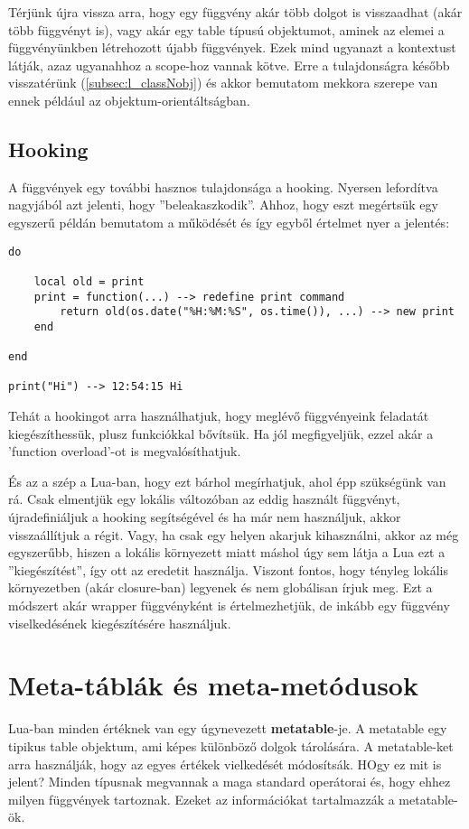\label{l_ref_proto}
Térjünk újra vissza arra, hogy egy függvény akár több dolgot is visszaadhat (akár több függvényt is), vagy akár egy table típusú objektumot, aminek az elemei a függvényünkben létrehozott újabb függvények. Ezek mind ugyanazt a kontextust látják, azaz ugyanahhoz a scope-hoz vannak kötve. Erre a tulajdonságra később visszatérünk (\ref{subsec:l_classNobj}) és akkor bemutatom mekkora szerepe van ennek például az objektum-orientáltságban.

\subsection{Hooking}

A függvények egy további hasznos tulajdonsága a hooking. Nyersen lefordítva nagyjából azt jelenti, hogy ''beleakaszkodik''. Ahhoz, hogy eszt megértsük egy egyszerű példán bemutatom a működését és így egyből értelmet nyer a jelentés:
\scriptsize
\begin{lstlisting}
do

	local old = print
	print = function(...) --> redefine print command
		return old(os.date("%H:%M:%S", os.time()), ...) --> new print 
	end

end

print("Hi") --> 12:54:15 Hi
\end{lstlisting}
\normalsize
Tehát a hookingot arra használhatjuk, hogy meglévő függvényeink feladatát kiegészíthessük, plusz funkciókkal bővítsük. Ha jól megfigyeljük, ezzel akár a 'function overload'-ot is megvalósíthatjuk. 

És az a szép a Lua-ban, hogy ezt bárhol megírhatjuk, ahol épp szükségünk van rá. Csak elmentjük egy lokális változóban az eddig használt függvényt, újradefiniáljuk a hooking segítségével és ha már nem használjuk, akkor visszaállítjuk a régit. Vagy, ha csak egy helyen akarjuk kihasználni, akkor az még egyszerűbb, hiszen a lokális környezett miatt máshol úgy sem látja a Lua ezt a ''kiegészítést'', így ott az eredetit használja. Viszont fontos, hogy tényleg lokális környezetben (akár closure-ban) legyenek és nem globálisan írjuk meg. Ezt a módszert akár wrapper függvényként is értelmezhetjük, de inkább egy függvény viselkedésének kiegészítésére használjuk. 


\section{Meta-táblák és meta-metódusok}
\label{sec:l_meta}

Lua-ban minden értéknek van egy úgynevezett \textbf{metatable}-je. A metatable egy tipikus table objektum, ami képes különböző dolgok tárolására. A metatable-ket arra használják, hogy az egyes értékek vielkedését módosítsák. HOgy ez mit is jelent? Minden típusnak megvannak a maga standard operátorai és, hogy ehhez milyen függvények tartoznak. Ezeket az információkat tartalmazzák a metatable-ök. 

